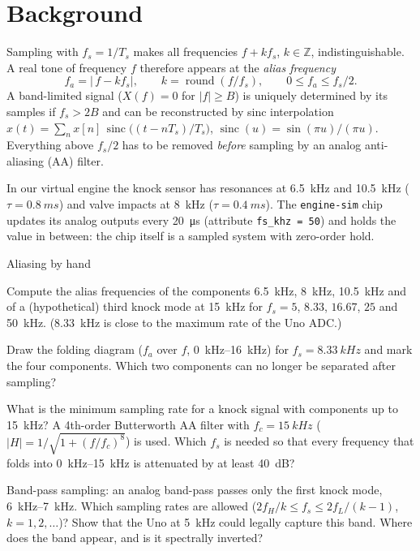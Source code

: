 \section*{Background}

Sampling with $f_s=1/T_s$ makes all frequencies $f+kf_s$, $k\in\mathbb{Z}$,
indistinguishable. A real tone of frequency $f$ therefore appears at the
\emph{alias frequency}
\[
f_a=\bigl|\,f-k f_s\bigr|,\qquad k=\operatorname{round}(f/f_s),
\qquad 0\le f_a\le f_s/2 .
\]
A band-limited signal ($X(f)=0$ for $|f|\ge B$) is uniquely determined by its
samples if $f_s>2B$ and can be reconstructed by sinc interpolation
$x(t)=\sum_n x[n]\,\operatorname{sinc}\bigl((t-nT_s)/T_s\bigr)$,
$\operatorname{sinc}(u)=\sin(\pi u)/(\pi u)$. Everything above $f_s/2$ has to be
removed \emph{before} sampling by an analog anti-aliasing (AA) filter.

In our virtual engine the knock sensor has resonances at \SI{6.5}{kHz} and
\SI{10.5}{kHz} ($\tau=\SI{0.8}{ms}$) and valve impacts at \SI{8}{kHz}
($\tau=\SI{0.4}{ms}$). The \texttt{engine-sim} chip updates its analog outputs
every \SI{20}{\micro s} (attribute \texttt{fs\_khz = 50}) and holds the value in
between: the chip itself is a sampled system with zero-order hold.

\begin{exercise}{Aliasing by hand}{\Paper}
\begin{tasks}
  \item Compute the alias frequencies of the components \SI{6.5}{kHz},
    \SI{8}{kHz}, \SI{10.5}{kHz} and of a (hypothetical) third knock mode at
    \SI{15}{kHz} for $f_s=5$, $8.33$, $16.67$, $25$ and \SI{50}{kHz}.
    (\SI{8.33}{kHz} is close to the maximum rate of the Uno ADC.)
  \item Draw the folding diagram ($f_a$ over $f$, \SIrange{0}{16}{kHz}) for
    $f_s=\SI{8.33}{kHz}$ and mark the four components. Which two components
    can no longer be separated after sampling?
  \item What is the minimum sampling rate for a knock signal with components
    up to \SI{15}{kHz}? A 4th-order Butterworth AA filter with
    $f_c=\SI{15}{kHz}$ ($|H|=1/\sqrt{1+(f/f_c)^8}$) is used. Which $f_s$ is
    needed so that every frequency that folds into \SIrange{0}{15}{kHz} is
    attenuated by at least \SI{40}{dB}?
  \item Band-pass sampling: an analog band-pass passes only the first knock
    mode, \SIrange{6}{7}{kHz}. Which sampling rates are allowed
    ($2f_H/k\le f_s\le 2f_L/(k-1)$, $k=1,2,\dots$)? Show that the Uno at
    \SI{5}{kHz} could legally capture this band. Where does the band appear,
    and is it spectrally inverted?
\end{tasks}
\end{exercise}

